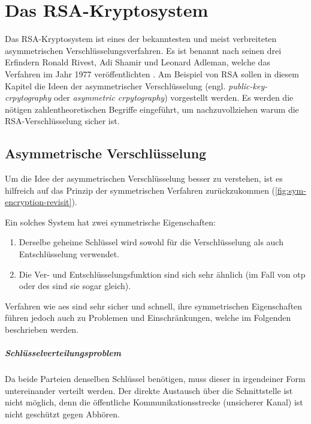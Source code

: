 \chapter{Das RSA-Kryptosystem}
Das RSA-Kryptosystem ist eines der bekanntesten und meist
verbreiteten asymmetrischen Verschlüsselungsverfahren. Es ist benannt nach
seinen drei Erfindern Ronald Rivest, Adi Shamir und Leonard Adleman, welche das Verfahren
im Jahr 1977 veröffentli\-chten \parencite[173]{BOOK:crypto}.
Am Beispiel von RSA sollen in diesem Kapitel die
Ideen der asymmetrischer Verschlüsselung
(engl. \textit{public-key-crpytography} oder \textit{asymmetric crpytography})
vorgestellt werden. Es werden die nötigen
zahlentheoretischen Begriffe eingeführt, um nachzuvollziehen
warum die RSA-Verschlüsselung sicher ist.

\section{Asymmetrische Verschlüsselung}
Um die Idee der asymmetrischen Verschlüsselung besser zu verstehen,
ist es hilfreich auf das Prinzip der symmetrischen Verfahren zurückzukommen
(\autoref{fig:sym-encryption-revisit}).



\noindent
Ein solches System hat zwei symmetrische Eigenschaften:
\begin{enumerate}
  \item Derselbe geheime Schlüssel wird sowohl für die
        Verschlüsselung als auch Entschlüs\-selung verwendet.
  \item Die Ver- und Entschlüsselungsfunktion sind sich sehr ähnlich
        (im Fall von \acs{otp} oder \acs{des} sind sie sogar gleich).
\end{enumerate}
Verfahren wie \acs{aes} sind sehr sicher und schnell,
ihre symmetrischen Eigenschaften führen jedoch auch zu Problemen
und Einschränkungen,
welche im Folgenden beschrieben werden.

\paragraph{Schlüsselverteilungsproblem}
Da beide Parteien denselben Schlüssel benötigen, muss dieser in
irgendeiner Form untereinander verteilt werden.
Der direkte Austausch über die Schnittstelle ist nicht möglich, denn
die öffentliche Kommunikationsstrecke (unsicherer Kanal) ist nicht geschützt gegen Abhören.


